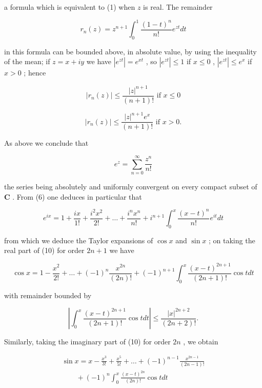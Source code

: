 a formula which is equivalent to (1) when \(z\) is real. The remainder

\[
r _ {n} (z) = z ^ {n + 1} \int_ {0} ^ {1} \frac {(1 - t) ^ {n}}{n !} e ^ {z t} d t
\]

in this formula can be bounded above, in absolute value, by using the inequality of the mean; if \(z = x + iy\) we have \(|e^{zt}| = e^{xt}\) , so \(|e^{zt}| \leqslant 1\) if \(x \leqslant 0\) , \(|e^{zt}| \leqslant e^x\) if \(x > 0\) ; hence

\[
\left| r _ {n} (z) \right| \leqslant \frac {\left| z \right| ^ {n + 1}}{(n + 1) !} \text {   if   } x \leqslant 0\tag{7}
\]

\[
| r _ {n} (z) | \leqslant \frac {| z | ^ {n + 1} e ^ {x}}{(n + 1) !} \text {   if   } x > 0.\tag{8}
\]

As above we conclude that

\[
e ^ {z} = \sum_ {n = 0} ^ {\infty} \frac {z ^ {n}}{n !}\tag{9}
\]

the series being absolutely and uniformly convergent on every compact subset of \(\mathbf{C}\) . From (6) one deduces in particular that

\[
e ^ {i x} = 1 + \frac {i x}{1 !} + \frac {i ^ {2} x ^ {2}}{2 !} + \dots + \frac {i ^ {n} x ^ {n}}{n !} + i ^ {n + 1} \int_ {0} ^ {x} \frac {(x - t) ^ {n}}{n !} e ^ {i t} d t\tag{10}
\]

from which we deduce the Taylor expansions of \(\cos x\) and \(\sin x\) ; on taking the real part of (10) for order \(2n + 1\) we have

\[
\cos x = 1 - \frac {x ^ {2}}{2 !} + \dots + (- 1) ^ {n} \frac {x ^ {2 n}}{(2 n) !} + (- 1) ^ {n + 1} \int_ {0} ^ {x} \frac {(x - t) ^ {2 n + 1}}{(2 n + 1) !} \cos t d t\tag{11}
\]

with remainder bounded by

\[
\left| \int_ {0} ^ {x} \frac {(x - t) ^ {2 n + 1}}{(2 n + 1) !} \cos t d t \right| \leqslant \frac {| x | ^ {2 n + 2}}{(2 n + 2) !}.\tag{12}
\]

Similarly, taking the imaginary part of (10) for order \(2n\) , we obtain

\[
\begin{array}{l} \sin x = x - \frac {x ^ {3}}{3 !} + \frac {x ^ {5}}{5 !} + \dots + (- 1) ^ {n - 1} \frac {x ^ {2 n - 1}}{(2 n - 1) !} \\ \qquad + (- 1) ^ {n} \int_ {0} ^ {x} \frac {(x - t) ^ {2 n}}{(2 n) !} \cos t d t \end{array}\tag{13}
\]

